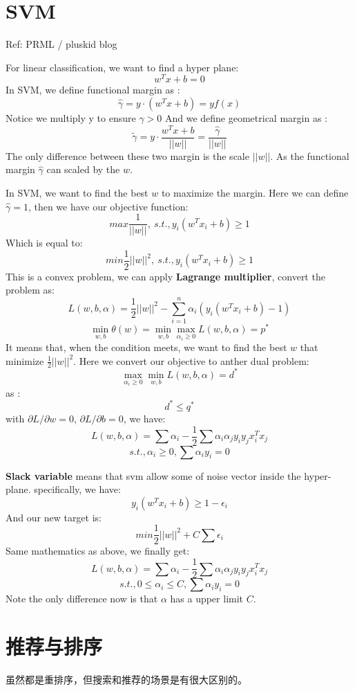 \documentclass{article}
\begin{document}
\begin{CJK*}{UTF8}{gbsn}
\section{SVM}
Ref: PRML / pluskid blog

For linear classification, we want to find a hyper plane:
$$w^{T}x+b=0$$
In SVM, we define functional margin as :
$$\widehat{\gamma}=y \cdot (w^{T}x+b) = yf(x) $$
Notice we multiply y to ensure $\widehat{\gamma} >0$
And we define geometrical margin as :
$$\widetilde{\gamma}= y \cdot \frac{w^{T}x+b}{||w||} = \frac{\widehat{\gamma}}{||w||} $$
The only difference between these two margin is the scale $||w||$. As the functional margin $\widehat{\gamma}$ can scaled by the $w$. 

In SVM, we want to find the best $w$ to maximize the margin. Here we can define $\widehat{\gamma}=1$, then we have our objective function:
$$max \frac{1}{||w||},\ s.t.,y_{i}(w^{T}x_{i}+b) \ge 1 $$
Which is equal to: 
$$min \frac{1}{2}||w||^{2},\ s.t.,y_{i}(w^{T}x_{i}+b) \ge 1 $$
This is a convex problem, we can apply \textbf{Lagrange multiplier}, convert the problem as:
$$L(w,b,\alpha)=\frac{1}{2}||w||^{2}-\sum_{i=1}^{n}\alpha_{i}(y_{i}(w^{T}x_{i}+b)-1)$$
$$\min \limits_{w,b}\theta(w)=\min \limits_{w,b} \max \limits_{\alpha_{i} \ge 0} L(w,b,\alpha)=p^{*} $$
It means that, when the condition meets, we want to find the best $w$ that minimize $\frac{1}{2}||w||^{2}$. 
Here we convert our objective to anther dual problem:
$$\max \limits_{\alpha_{i} \ge 0} \min \limits_{w,b}  L(w,b,\alpha) =d^{*} $$
as :
$$d^{*} \leq q^{*}$$ 
with $\partial L / \partial w =0 $, $\partial L / \partial b =0 $, we have:
$$L(w,b,\alpha)=\sum \alpha_{i}-\frac{1}{2}\sum \alpha_{i}\alpha_{j}y_{i}y_{j}x_{i}^{T}x_{j}$$
$$s.t., \alpha_{i} \ge 0, \sum \alpha_{i}y_{i}=0 $$

\textbf{Slack variable} means that svm allow some of noise vector inside the hyper-plane. specifically, we have:
$$y_{i}(w^{T}x_{i}+b) \ge 1 - \epsilon_{i}$$
And our new target is: 
$$min \frac{1}{2} ||w||^{2} +C\sum \epsilon_{i}$$
Same mathematics as above, we finally get: 
$$L(w,b,\alpha)=\sum \alpha_{i}-\frac{1}{2}\sum \alpha_{i}\alpha_{j}y_{i}y_{j}x_{i}^{T}x_{j}$$
$$s.t.,  0 \leq \alpha_{i} \leq C, \sum \alpha_{i}y_{i}=0 $$
Note the only difference now is that $\alpha$ has a upper limit $C$. 

\section{推荐与排序}
虽然都是重排序，但搜索和推荐的场景是有很大区别的。


\end{CJK*}
\end{document}

